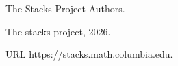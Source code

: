 {The Stacks Project Authors}.

\newblock The stacks project, 2026.

\newblock URL \url{https://stacks.math.columbia.edu}.

